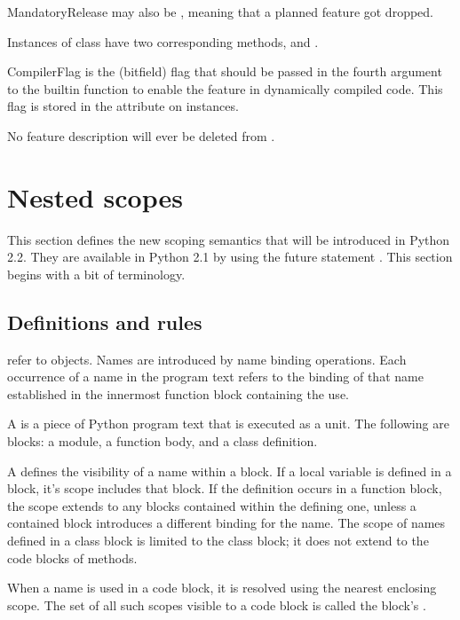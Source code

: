 MandatoryRelease may also be , meaning that a planned
feature got dropped.

Instances of class  have two corresponding methods,
 and .

CompilerFlag is the (bitfield) flag that should be passed in the
fourth argument to the builtin function  to enable
the feature in dynamically compiled code.  This flag is stored in the
 attribute on  instances.

No feature description will ever be deleted from .

\section{Nested scopes \label{nested-scopes}}

This section defines the new scoping semantics that will be introduced
in Python 2.2.  They are available in Python 2.1 by using the future
statement .  This section begins with a bit of
terminology. 

\subsection{Definitions and rules \label{definitions}}

 refer to objects.  Names are introduced by name binding
operations.  Each occurrence of a name in the program text refers to
the binding of that name established in the innermost function block
containing the use.

A  is a piece of Python program text that is executed as
a unit.  The following are blocks: a module, a function body, and a
class definition.

A  defines the visibility of a name within a block.  If a
local variable is defined in a block, it's scope includes that block.
If the definition occurs in a function block, the scope extends to any
blocks contained within the defining one, unless a contained block
introduces a different binding for the name.  The scope of names
defined in a class block is limited to the class block; it does not
extend to the code blocks of methods.

When a name is used in a code block, it is resolved using the nearest
enclosing scope.  The set of all such scopes visible to a code block
is called the block's .  

